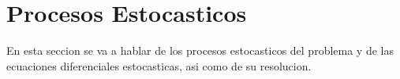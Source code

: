 
\section{Procesos Estocasticos}

	En esta seccion se va a hablar de los procesos estocasticos del problema y de las ecuaciones diferenciales estocasticas, asi como de su resolucion.
